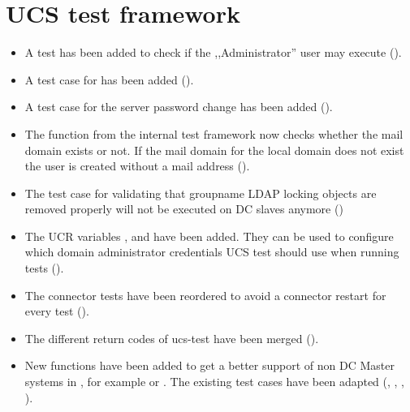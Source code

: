 

\section{UCS test framework}
\begin{itemize}
\item A test has been added to check if the ,,Administrator'' user may execute
   ().

\item A test case for  has been added ().

\item A test case for the server password change has been added ().

\item The function  from the internal test framework now checks whether the
mail domain exists or not. If the mail domain for the local domain does not exist the user is
created without a mail address ().
\item The test case for validating that groupname LDAP locking objects
  are removed properly will not be executed on DC slaves anymore
  ()
\item The UCR variables ,
     and 
    have been added. They can be used to configure which domain administrator
    credentials UCS test should use when running tests ().

\item The connector tests have been reordered to avoid a connector restart for every test ().

\item The different return codes of ucs-test have been merged ().

\item New functions have been added to get a better support of non DC Master
systems in , for example  or
. The existing test cases have been adapted
(, , , ).


\end{itemize}
